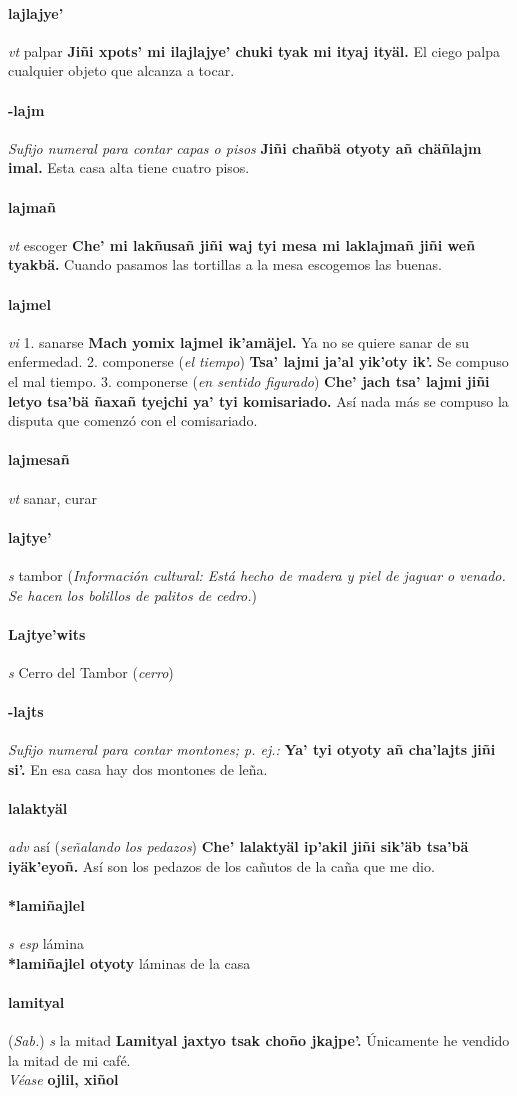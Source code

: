 \documentclass{scrbook}
\newcommand{\entry}[1]{\paragraph{#1}}
\newcommand{\onedefinition}[1]{#1.}
\newcommand{\nontranslationdef}[1]{\textit{#1}}
\newcommand{\partofspeech}[1]{\textit{#1}}
\newcommand{\spanishtranslation}[1]{#1}
\newcommand{\clarification}[1]{(\textit{#1})}
\newcommand{\cholexample}[1]{\textbf{#1}}
\newcommand{\exampletranslation}[1]{#1}
\newcommand{\alsosee}[1]{\\\textit{Véase} \textbf{#1}}
\newcommand{\relevantdialect}[1]{(\textit{#1})}
\newcommand{\culturalinformation}[1]{(\textit{#1})}
\newcommand{\secondaryentry}[1]{\\\textbf{#1}}
\newcommand{\secondtranslation}[1]{#1}
\begin{document}
\begin{multicols}{2}
\entry{lajlajye'}
\partofspeech{vt}
\spanishtranslation{palpar}
\cholexample{Jiñi xpots' mi ilajlajye' chuki tyak mi ityaj ityäl.}
\exampletranslation{El ciego palpa cualquier objeto que alcanza a tocar.}

\entry{-lajm}
\nontranslationdef{Sufijo numeral para contar capas o pisos}
\cholexample{Jiñi chañbä otyoty añ chäñlajm imal.}
\exampletranslation{Esta casa alta tiene cuatro pisos.}

\entry{lajmañ}
\partofspeech{vt}
\spanishtranslation{escoger}
\cholexample{Che' mi lakñusañ jiñi waj tyi mesa mi laklajmañ jiñi weñ tyakbä.}
\exampletranslation{Cuando pasamos las tortillas a la mesa escogemos las buenas.}

\entry{lajmel}
\partofspeech{vi}
\onedefinition{1}
\spanishtranslation{sanarse}
\cholexample{Mach yomix lajmel ik'amäjel.}
\exampletranslation{Ya no se quiere sanar de su enfermedad.}
\onedefinition{2}
\spanishtranslation{componerse}
\clarification{el tiempo}
\cholexample{Tsa' lajmi ja'al yik'oty ik'.}
\exampletranslation{Se compuso el mal tiempo.}
\onedefinition{3}
\spanishtranslation{componerse}
\clarification{en sentido figurado}
\cholexample{Che' jach tsa' lajmi jiñi letyo tsa'bä ñaxañ tyejchi ya' tyi komisariado.}
\exampletranslation{Así nada más se compuso la disputa que comenzó con el comisariado.}

\entry{lajmesañ}
\partofspeech{vt}
\spanishtranslation{sanar, curar}

\entry{lajtye'}
\partofspeech{s}
\spanishtranslation{tambor}
\culturalinformation{Información cultural: Está hecho de madera y piel de jaguar o venado. Se hacen los bolillos de palitos de cedro.}

\entry{Lajtye'wits}
\partofspeech{s}
\spanishtranslation{Cerro del Tambor}
\clarification{cerro}

\entry{-lajts}
\nontranslationdef{Sufijo numeral para contar montones; p. ej.:}
\cholexample{Ya' tyi otyoty añ cha'lajts jiñi si'.}
\exampletranslation{En esa casa hay dos montones de leña.}

\entry{lalaktyäl}
\partofspeech{adv}
\spanishtranslation{así}
\clarification{señalando los pedazos}
\cholexample{Che' lalaktyäl ip'akil jiñi sik'äb tsa'bä iyäk'eyoñ.}
\exampletranslation{Así son los pedazos de los cañutos de la caña que me dio.}

\entry{*lamiñajlel}
\partofspeech{s esp}
\spanishtranslation{lámina}
\secondaryentry{*lamiñajlel otyoty}
\secondtranslation{láminas de la casa}

\entry{lamityal}
\relevantdialect{Sab.}
\partofspeech{s}
\spanishtranslation{la mitad}
\cholexample{Lamityal jaxtyo tsak choño jkajpe'.}
\exampletranslation{Únicamente he vendido la mitad de mi café.}
\alsosee{ojlil, xiñol}


\end{multicols}
\end{document}
